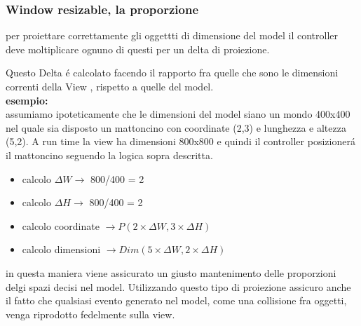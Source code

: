 \documentclass[a4paper,12pt]{report}
\begin{document}
\subsubsection{Window resizable, la proporzione}
per proiettare correttamente gli oggettti di dimensione del model il controller deve moltiplicare ognuno
di questi per un delta di proiezione.

Questo Delta é calcolato facendo il rapporto fra quelle che sono le dimensioni correnti della View , rispetto
a quelle del model.\\
\textbf{esempio:} \\
assumiamo ipoteticamente che le dimensioni del model siano un mondo 400x400 nel quale sia disposto un mattoncino
con coordinate (2,3) e lunghezza e altezza (5,2).
A run time la view ha dimensioni 800x800  e quindi il controller posizionerá il mattoncino seguendo la logica
sopra descritta.\\
\begin{itemize}
    \item calcolo $\Delta W \rightarrow$  800/400 = 2
    \item calcolo $\Delta H \rightarrow$  800/400 = 2
    \item calcolo coordinate $\rightarrow P(2 \times \Delta W, 3\times \Delta H)$
    \item calcolo dimensioni $\rightarrow Dim(5 \times \Delta W,2\times \Delta H)$
\end{itemize}
in questa maniera viene assicurato un giusto mantenimento delle proporzioni delgi spazi decisi nel model.
Utilizzando questo tipo di proiezione assicuro anche il fatto che qualsiasi evento generato nel model, come una
collisione fra oggetti, venga riprodotto fedelmente sulla view.


\pagebreak
\end{document}
